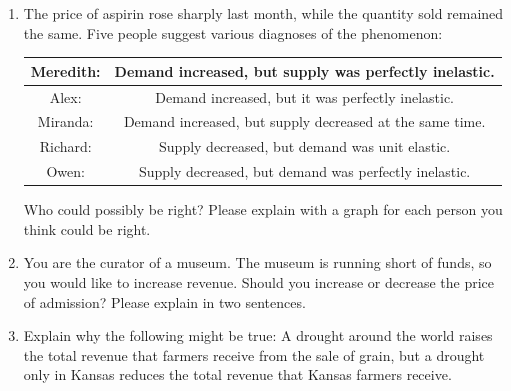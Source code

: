 \documentclass{article}
\begin{document}
\begin{enumerate}
	\begin{enumerate}
	
	\item What happens to the price of coffee beans?
	
	\item What happens to the price of a cup of coffee? What happens to total expenditure on cups of coffee?
	
	\item What happens to the price of donuts? What happens to total expenditure on donuts?
	
	\end{enumerate}

\item The price of aspirin rose sharply last month, while the quantity sold remained the same. Five people suggest various diagnoses of the phenomenon:

	\begin{tabular}{| c | c |}
	\hline
	Meredith: & Demand increased, but supply was perfectly inelastic. \\
	\hline
	Alex: & Demand increased, but it was perfectly inelastic. \\
	\hline
	Miranda: & Demand increased, but supply decreased at the same time. \\
	\hline
	Richard: & Supply decreased, but demand was unit elastic. \\
	\hline
	Owen: & Supply decreased, but demand was perfectly inelastic. \\
	\hline
	\end{tabular}
	
	Who could possibly be right? Please explain with a graph for each person you think could be right.
	
\item You are the curator of a museum. The museum is running short of funds, so you would like to increase revenue. Should you increase or decrease the price of admission? Please explain in two sentences.

\item Explain why the following might be true: A drought around the world raises the total revenue that farmers receive from the sale of grain, but a drought only in Kansas reduces the total revenue that Kansas farmers receive.

\end{enumerate}
\end{document}
